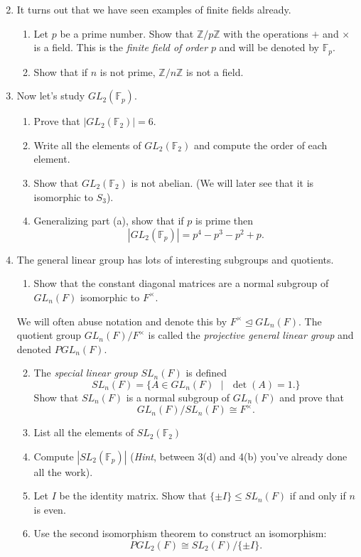 \documentclass[11pt]{article}
\newcommand{\bF}{\mathbb{F}}
\newcommand{\bZ}{\mathbb{Z}}
\begin{document}
\begin{enumerate}
  \setcounter{enumi}{1}
  \item It turns out that we have seen examples of finite fields already.
  \begin{enumerate}
    \item Let $p$ be a prime number.  Show that $\bZ/p\bZ$ with the operations $+$ and $\times$ is a field.  This is the \textit{finite field of order} $p$ and will be denoted by $\bF_p$.
    \item Show that if $n$ is not prime, $\bZ/n\bZ$ is not a field.
  \end{enumerate}
\item Now let's study $GL_2(\bF_p)$.
  \begin{enumerate}
    \item Prove that $|GL_2(\bF_2)| = 6$.
    \item Write all the elements of $GL_2(\bF_2)$ and compute the order of each element.
    \item Show that $GL_2(\bF_2)$ is not abelian.  (We will later see that it is isomorphic to $S_3$).
    \item Generalizing part (a), show that if $p$ is prime then
    \[|GL_2(\bF_p)| = p^4-p^3-p^2+p.\]
  \end{enumerate}
  \item The general linear group has lots of interesting subgroups and quotients.
  \begin{enumerate}
    \item Show that the constant diagonal matrices are a normal subgroup of $GL_n(F)$ isomorphic to $F^\times$.
  \end{enumerate}
  We will often abuse notation and denote this by $F^\times\unlhd GL_n(F)$.  The quotient group $GL_n(F)/F^\times$ is called the \textit{projective general linear group} and denoted $PGL_n(F)$.
  \begin{enumerate}
    \setcounter{enumii}{1}
    \item The \textit{special linear group} $SL_n(F)$ is defined
    \[SL_n(F) = \{A\in GL_n(F)\text{ }|\text{ }\det(A) = 1.\}\]
    Show that $SL_n(F)$ is a normal subgroup of $GL_n(F)$ and prove that
    \[GL_n(F)/SL_n(F)\cong F^\times.\]
    \item List all the elements of $SL_2(\bF_2)$
    \item Compute $|SL_2(\bF_p)|$  (\textit{Hint}, between 3(d) and 4(b) you've already done all the work).
    \item Let $I$ be the identity matrix.  Show that $\{\pm I\}\le SL_n(F)$ if and only if $n$ is even.
    \item Use the second isomorphism theorem to construct an isomorphism:
    \[PGL_2(F)\cong SL_2(F)/\{\pm I\}.\]
  \end{enumerate}
\end{enumerate}
\end{document}
